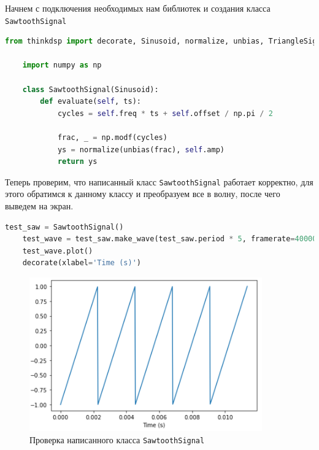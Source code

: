 \documentclass[a4paper]{article}
\begin{document}
            Начнем с подключения необходимых нам библиотек и создания класса \\
            \texttt{SawtoothSignal}
            
\begin{lstlisting}[language=Python, caption= Создание класса \texttt{SawtoothSignal}]
    from thinkdsp import decorate, Sinusoid, normalize, unbias, TriangleSignal, SquareSignal, SinSignal, CosSignal, ParabolicSignal

    import numpy as np

    class SawtoothSignal(Sinusoid):
        def evaluate(self, ts):
            cycles = self.freq * ts + self.offset / np.pi / 2
            
            frac, _ = np.modf(cycles)
            ys = normalize(unbias(frac), self.amp)
            return ys
\end{lstlisting}    
            
            Теперь проверим, что написанный класс \texttt{SawtoothSignal} работает корректно, для этого обратимся к данному классу и преобразуем все в волну, после чего выведем на экран.

\begin{lstlisting}[language=Python, caption= Тестирование класса \texttt{SawtoothSignal}]
    test_saw = SawtoothSignal()
    test_wave = test_saw.make_wave(test_saw.period * 5, framerate=40000)
    test_wave.plot()
    decorate(xlabel='Time (s)')
\end{lstlisting}               
            
            \begin{figure}[H]
                \centering
                \includegraphics[width=\textwidth]{ex_2_test_class.png}
                \caption{Проверка написанного класса \texttt{SawtoothSignal}}
                \label{fig:test_class}
            \end{figure}
            
\end{document}
